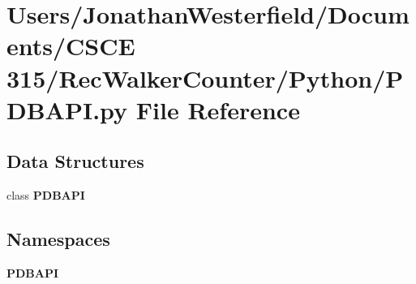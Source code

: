 \section{Users/\+Jonathan\+Westerfield/\+Documents/\+C\+S\+CE 315/\+Rec\+Walker\+Counter/\+Python/\+P\+D\+B\+A\+PI.py File Reference}
\label{_p_d_b_a_p_i_8py}
\subsection*{Data Structures}
\begin{DoxyCompactItemize}
\item 
class {\bf P\+D\+B\+A\+PI}
\end{DoxyCompactItemize}
\subsection*{Namespaces}
\begin{DoxyCompactItemize}
\item 
 {\bf P\+D\+B\+A\+PI}
\end{DoxyCompactItemize}
